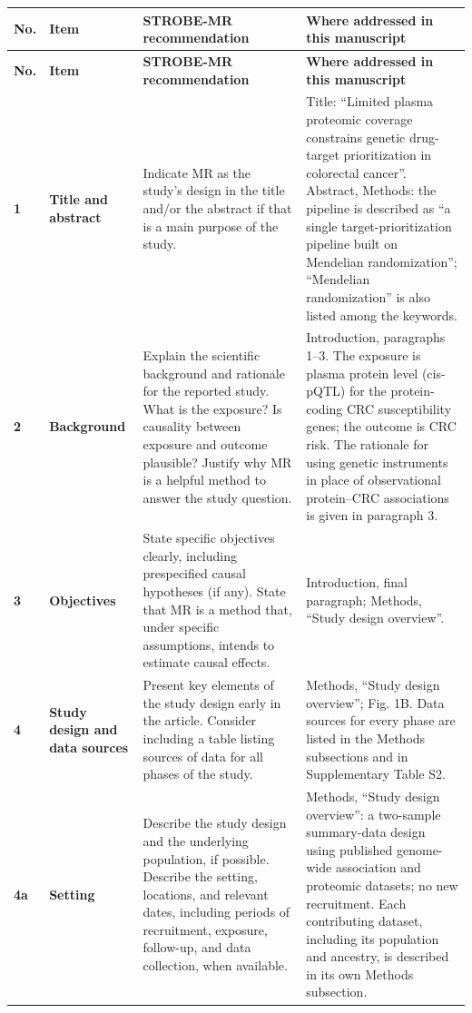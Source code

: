 \documentclass[10pt,a4paper]{article}
\begin{document}
\begin{longtable}{@{}p{7mm}p{32mm}p{52mm}p{68mm}@{}}
\toprule
\textbf{No.} & \textbf{Item} & \textbf{STROBE-MR recommendation} & \textbf{Where addressed in this manuscript} \\
\midrule
\endfirsthead
\toprule
\textbf{No.} & \textbf{Item} & \textbf{STROBE-MR recommendation} & \textbf{Where addressed in this manuscript} \\
\midrule
\endhead
\bottomrule
\endlastfoot
\textbf{1} & \textbf{Title and abstract} & Indicate MR as the study's design in the title and/or the abstract if that is a main purpose of the study. & Title: ``Limited plasma proteomic coverage constrains genetic drug-target prioritization in colorectal cancer''. Abstract, Methods: the pipeline is described as ``a single target-prioritization pipeline built on Mendelian randomization''; ``Mendelian randomization'' is also listed among the keywords. \\
\midrule
\textbf{2} & \textbf{Background} & Explain the scientific background and rationale for the reported study. What is the exposure? Is causality between exposure and outcome plausible? Justify why MR is a helpful method to answer the study question. & Introduction, paragraphs 1--3. The exposure is plasma protein level (cis-pQTL) for the protein-coding CRC susceptibility genes; the outcome is CRC risk. The rationale for using genetic instruments in place of observational protein--CRC associations is given in paragraph 3. \\
\midrule
\textbf{3} & \textbf{Objectives} & State specific objectives clearly, including prespecified causal hypotheses (if any). State that MR is a method that, under specific assumptions, intends to estimate causal effects. & Introduction, final paragraph; Methods, ``Study design overview''. \\
\midrule
\textbf{4} & \textbf{Study design and data sources} & Present key elements of the study design early in the article. Consider including a table listing sources of data for all phases of the study. & Methods, ``Study design overview''; Fig. 1B. Data sources for every phase are listed in the Methods subsections and in Supplementary Table S2. \\
\midrule
\textbf{4a} & \textbf{Setting} & Describe the study design and the underlying population, if possible. Describe the setting, locations, and relevant dates, including periods of recruitment, exposure, follow-up, and data collection, when available. & Methods, ``Study design overview'': a two-sample summary-data design using published genome-wide association and proteomic datasets; no new recruitment. Each contributing dataset, including its population and ancestry, is described in its own Methods subsection. \\

\end{longtable}
\end{document}
